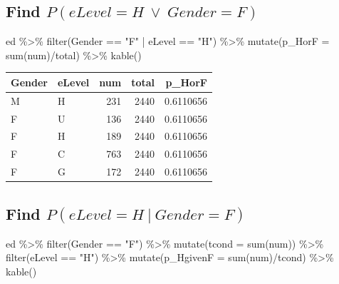 \documentclass[
  letterpaper,
]{book}
\newenvironment{Shaded}{\begin{snugshade}}{\end{snugshade}}
\newcommand{\AttributeTok}[1]{\textcolor[rgb]{0.40,0.45,0.13}{#1}}
\newcommand{\FunctionTok}[1]{\textcolor[rgb]{0.28,0.35,0.67}{#1}}
\newcommand{\NormalTok}[1]{\textcolor[rgb]{0.00,0.23,0.31}{#1}}
\newcommand{\SpecialCharTok}[1]{\textcolor[rgb]{0.37,0.37,0.37}{#1}}
\newcommand{\StringTok}[1]{\textcolor[rgb]{0.13,0.47,0.30}{#1}}
\begin{document}
\hypertarget{find-pelevel-h-vee-gender-f}{%
\subsection{\texorpdfstring{Find
\(P(eLevel = H\ \vee \ Gender = F)\)}{Find P(eLevel = H\textbackslash{} \textbackslash vee \textbackslash{} Gender = F)}}\label{find-pelevel-h-vee-gender-f}}

\begin{Shaded}
\begin{Highlighting}[]
\NormalTok{ed }\SpecialCharTok{\%\textgreater{}\%}
  \FunctionTok{filter}\NormalTok{(Gender }\SpecialCharTok{==} \StringTok{"F"} \SpecialCharTok{|}\NormalTok{ eLevel }\SpecialCharTok{==} \StringTok{"H"}\NormalTok{) }\SpecialCharTok{\%\textgreater{}\%}
  \FunctionTok{mutate}\NormalTok{(}\AttributeTok{p\_HorF =} \FunctionTok{sum}\NormalTok{(num)}\SpecialCharTok{/}\NormalTok{total) }\SpecialCharTok{\%\textgreater{}\%}
  \FunctionTok{kable}\NormalTok{()}
\end{Highlighting}
\end{Shaded}

\begin{longtable}[]{@{}llrrr@{}}
\toprule\noalign{}
Gender & eLevel & num & total & p\_HorF \\
\midrule\noalign{}
\endhead
\bottomrule\noalign{}
\endlastfoot
M & H & 231 & 2440 & 0.6110656 \\
F & U & 136 & 2440 & 0.6110656 \\
F & H & 189 & 2440 & 0.6110656 \\
F & C & 763 & 2440 & 0.6110656 \\
F & G & 172 & 2440 & 0.6110656 \\
\end{longtable}

\hypertarget{find-pelevel-h-gender-f}{%
\subsection{\texorpdfstring{Find
\(P(eLevel = H\ |\ Gender = F)\)}{Find P(eLevel = H\textbackslash{} \textbar\textbackslash{} Gender = F)}}\label{find-pelevel-h-gender-f}}

\begin{Shaded}
\begin{Highlighting}[]
\NormalTok{ed }\SpecialCharTok{\%\textgreater{}\%}
  \FunctionTok{filter}\NormalTok{(Gender }\SpecialCharTok{==} \StringTok{"F"}\NormalTok{) }\SpecialCharTok{\%\textgreater{}\%}
  \FunctionTok{mutate}\NormalTok{(}\AttributeTok{tcond =} \FunctionTok{sum}\NormalTok{(num)) }\SpecialCharTok{\%\textgreater{}\%} 
  \FunctionTok{filter}\NormalTok{(eLevel }\SpecialCharTok{==} \StringTok{"H"}\NormalTok{) }\SpecialCharTok{\%\textgreater{}\%}
  \FunctionTok{mutate}\NormalTok{(}\AttributeTok{p\_HgivenF =} \FunctionTok{sum}\NormalTok{(num)}\SpecialCharTok{/}\NormalTok{tcond) }\SpecialCharTok{\%\textgreater{}\%}
  \FunctionTok{kable}\NormalTok{()}
\end{Highlighting}
\end{Shaded}
\end{document}
